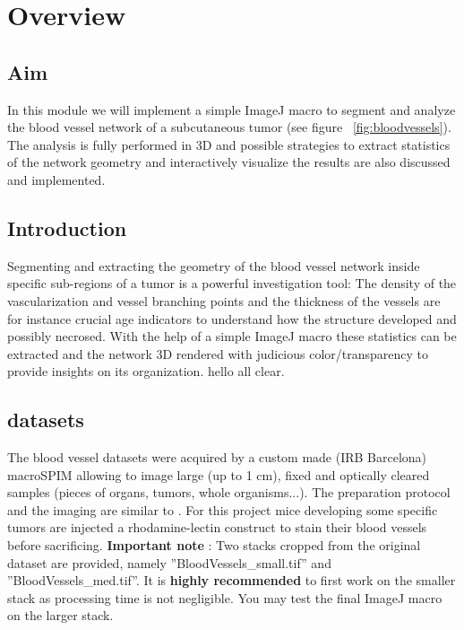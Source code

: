 \section{Overview}

\subsection{Aim}
In this module we will implement a simple ImageJ macro to segment and analyze the blood vessel network of a subcutaneous tumor (see figure ~\ref{fig:bloodvessels}). The analysis is fully performed in 3D and possible strategies to extract statistics of the network geometry and interactively visualize the results are also discussed and implemented.

\subsection{Introduction}
\label{sec:mod8lab0}

Segmenting and extracting the geometry of the blood vessel network inside specific sub-regions of a tumor is a powerful investigation tool: The density of the vascularization and vessel branching points and the thickness of the vessels are for instance crucial age indicators to understand how the structure developed and possibly necrosed. With the help of a simple ImageJ macro these statistics can be extracted and the network 3D rendered with judicious color/transparency to provide insights on its organization. hello all clear.

\subsection{datasets}
The blood vessel datasets were acquired by a custom made (IRB Barcelona) macroSPIM allowing to image large (up to 1 cm), fixed and optically cleared samples (pieces of organs, tumors, whole organisms...). The preparation protocol and the imaging are similar to \cite{jahrling20093d}. For this project mice developing some specific tumors are injected a rhodamine-lectin construct to stain their blood vessels before sacrificing.
\textbf{Important note} : Two stacks cropped from the original dataset are provided, namely ''BloodVessels\_small.tif'' and ''BloodVessels\_med.tif''. It is \textbf{highly recommended} to first work on the smaller stack as processing time is not negligible. You may test the final ImageJ macro on the larger stack.